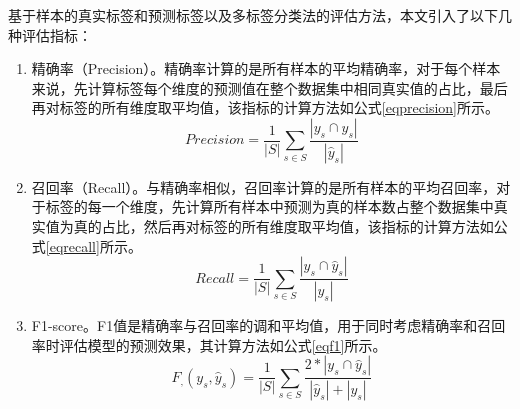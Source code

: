 基于样本的真实标签和预测标签以及多标签分类法的评估方法，本文引入了以下几种评估指标：
\begin{enumerate}[label=(\arabic*)]
    \item 精确率（Precision）。精确率计算的是所有样本的平均精确率，对于每个样本来说，先计算标签每个维度的预测值在整个数据集中相同真实值的占比，最后再对标签的所有维度取平均值，该指标的计算方法如公式\eqref{eqprecision}所示。
\begin{equation}
    Precision=\frac1{|S|}\sum_{s\in S}\frac{|y_s\cap\hat{y}_s|}{|\hat{y}_s|} \label{eqprecision}
\end{equation}
    \item 召回率（Recall）。与精确率相似，召回率计算的是所有样本的平均召回率，对于标签的每一个维度，先计算所有样本中预测为真的样本数占整个数据集中真实值为真的占比，然后再对标签的所有维度取平均值，该指标的计算方法如公式\eqref{eqrecall}所示。
\begin{equation}
    Recall=\frac{1}{|S|}\sum_{s\in S}\frac{|y_s\cap\hat{y}_s|}{|y_s|} \label{eqrecall}
\end{equation}
    \item F1-score。F1值是精确率与召回率的调和平均值，用于同时考虑精确率和召回率时评估模型的预测效果，其计算方法如公式\eqref{eqf1}所示。
\begin{equation}
    F_\text{,}(y_s,\hat{y}_s)=\frac{1}{|S|}\sum_{s\in S}\frac{2*|y_s\cap\hat{y}_s|}{|\hat{y}_s|+|y_s|} \label{eqf1}
\end{equation}
\end{enumerate}

